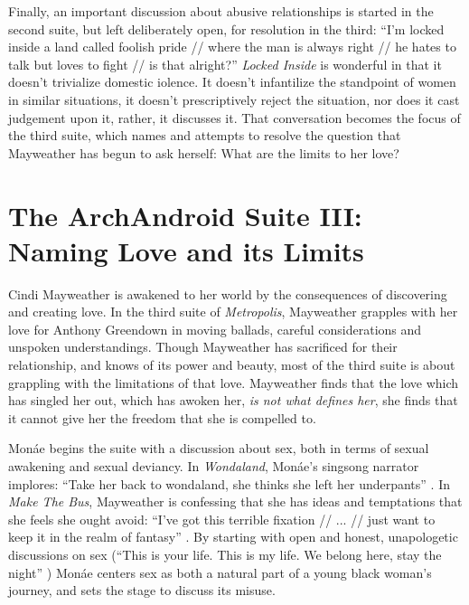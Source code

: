 \documentclass[a4paper, 11pt]{article} %
\begin{document}
Finally, an important discussion about abusive relationships is started in the second suite, but left deliberately open, for resolution in the third:
``I'm locked inside a land called foolish pride // where the man is always right // he hates to talk but loves to fight // is that alright?'' \cite{lockedinside}
\emph{Locked Inside} is wonderful in that it doesn't trivialize domestic iolence. 
It doesn't infantilize the standpoint of women in similar situations, it doesn't prescriptively reject the situation, nor does it cast judgement upon it, rather, it discusses it.
That conversation becomes the focus of the third suite, which names and attempts to resolve the question that Mayweather has begun to ask herself:
What are the limits to her love?


\section*{The ArchAndroid Suite III: Naming Love and its Limits}

Cindi Mayweather is awakened to her world by the consequences of discovering and creating love.
In the third suite of \emph{Metropolis}, Mayweather grapples with her love for Anthony Greendown in moving ballads, careful considerations and unspoken understandings.
Though Mayweather has sacrificed for their relationship, and knows of its power and beauty, most of the third suite is about grappling with the limitations of that love.
Mayweather finds that the love which has singled her out, which has awoken her, \emph{is not what defines her}, she finds that it cannot give her the freedom that she is compelled to.

Mon\'ae begins the suite with a discussion about sex, both in terms of sexual awakening and sexual deviancy.
In \emph{Wondaland}, Mon\'ae's singsong narrator implores: ``Take her back to wondaland, she thinks she left her underpants'' \cite{wondaland}.
In \emph{Make The Bus}, Mayweather is confessing that she has ideas and temptations that she feels she ought avoid:
``I've got this terrible fixation // ... // just want to keep it in the realm of fantasy'' \cite{makethebus}.
By starting with open and honest, unapologetic discussions on sex (``This is your life. This is my life. We belong here, stay the night'' \cite{wondaland}) 
Mon\'ae centers sex as both a natural part of a young black woman's journey, and sets the stage to discuss its misuse.
\end{document}
